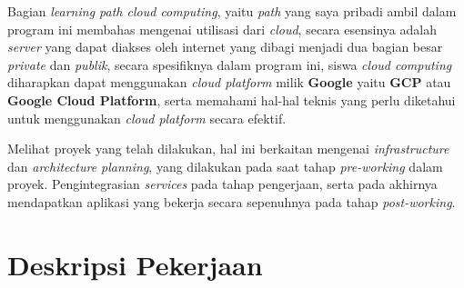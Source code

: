 Bagian \textit{learning path cloud computing}, yaitu \textit{path} yang saya pribadi ambil dalam program ini membahas mengenai utilisasi dari \textit{cloud}, secara esensinya adalah \textit{server} yang dapat diakses oleh internet yang dibagi menjadi dua bagian besar \textit{private} dan \textit{publik}, secara spesifiknya dalam program ini, siswa \textit{cloud computing} diharapkan dapat menggunakan \textit{cloud platform} milik \textbf{Google} yaitu \textbf{GCP} atau \textbf{Google Cloud Platform}, serta memahami hal-hal teknis yang perlu diketahui untuk menggunakan \textit{cloud platform} secara efektif.

Melihat proyek yang telah dilakukan, hal ini berkaitan mengenai \textit{infrastructure} dan \textit{architecture planning}, yang dilakukan pada saat tahap \textit{pre-working} dalam proyek. Pengintegrasian \textit{services} pada tahap pengerjaan, serta pada akhirnya mendapatkan aplikasi yang bekerja secara sepenuhnya pada tahap \textit{post-working}.

\section{Deskripsi Pekerjaan}

